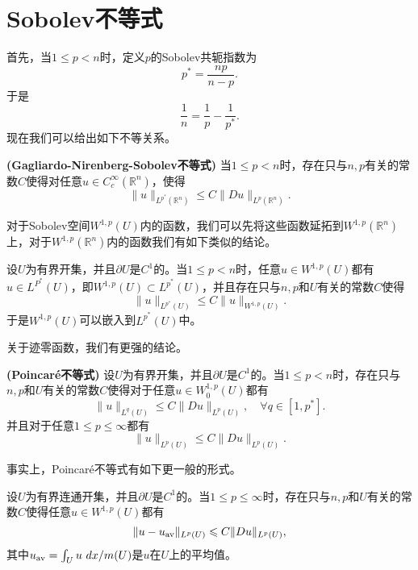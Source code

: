 \documentclass[a4paper,10pt]{ctexart}
\begin{document}
\section{Sobolev不等式}
首先，当$ 1\leqslant p< n $时，定义$ p $的Sobolev共轭指数为
\begin{equation}
    p^* = \dfrac{np}{n-p}.
\end{equation}
于是
\[
    \frac{1}{n} = \frac{1}{p} - \frac{1}{p^*}.
\]
现在我们可以给出如下不等关系。
\begin{theorem}{\normalfont\textbf{(Gagliardo-Nirenberg-Sobolev不等式)}}
    当$ 1\leqslant p < n $时，存在只与$ n,p $有关的常数$ C $使得对任意$ u\in C^{\infty}_c(\mathbb{R}^n) $，使得
    \begin{equation}
        \| u \|_{L^{p^*}(\mathbb{R}^n)} \leqslant C \| D u \|_{L^p(\mathbb{R}^n)}.
    \end{equation}
\end{theorem}
对于Sobolev空间$ W^{1,p}(U) $内的函数，我们可以先将这些函数延拓到$ W^{1,p}(\mathbb{R}^n) $上，对于$ W^{1,p}(\mathbb{R}^n) $内的函数我们有如下类似的结论。
\begin{theorem}
    设$ U $为有界开集，并且$ \partial U $是$ C^1 $的。当$ 1\leqslant p < n $时，任意$ u\in W^{1,p}(U) $都有$ u\in L^{P^*}(U) $，即$ W^{1,p}(U)\subset L^{p^*}(U) $，并且存在只与$ n,p $和$ U $有关的常数$ C $使得
    \begin{equation}
        \| u \|_{L^{p^*}(U)} \leqslant C \| u \|_{W^{1,p}(U)}.
    \end{equation}
    于是$ W^{1,p}(U) $可以嵌入到$ L^{p^*}(U) $中。
\end{theorem}
关于迹零函数，我们有更强的结论。
\begin{theorem}{\normalfont\textbf{(Poincaré不等式)}}
    设$ U $为有界开集，并且$ \partial U $是$ C^1 $的。当$ 1\leqslant p < n $时，存在只与$ n,p $和$ U $有关的常数$ C $使得对于任意$ u\in W^{1,p}_0(U) $都有
    \begin{equation}
        \| u \|_{L^{q}(U)} \leqslant C \| D u \|_{L^p(U)},\quad \forall q\in [1,p^*].
    \end{equation}
    并且对于任意$ 1\leqslant p\leqslant \infty $都有
    \begin{equation}
        \| u \|_{L^{p}(U)} \leqslant C \| D u \|_{L^p(U)}.
    \end{equation}
\end{theorem}

事实上，Poincaré不等式有如下更一般的形式。
\begin{theorem}
    设$ U $为有界连通开集，并且$ \partial U $是$ C^1 $的。当$ 1\leqslant p \leqslant \infty $时，存在只与$ n,p $和$ U $有关的常数$ C $使得任意$ u\in W^{1,p}(U) $都有
    \begin{equation}
        \| u - u_{\rm av} \|_{L^{p}(U)} \leqslant C \| D u \|_{L^p(U)},
    \end{equation}
    其中$ u_{\rm av} =  \int_U u \ d x / m(U) $是$ u $在$ U $上的平均值。
\end{theorem}
\end{document}
